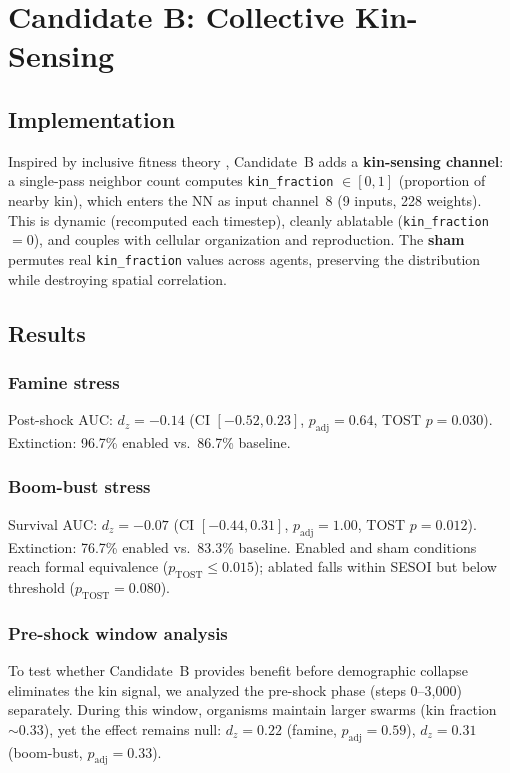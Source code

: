 \documentclass[letterpaper]{article}
\begin{document}
\section{Candidate B: Collective Kin-Sensing}

\subsection{Implementation}

Inspired by inclusive fitness theory \citep{hamilton_1964_genetical},
Candidate~B adds a \textbf{kin-sensing channel}: a single-pass neighbor
count computes \texttt{kin\_fraction} $\in [0, 1]$ (proportion of
nearby kin), which enters the NN as input channel~8 (9 inputs, 228
weights).  This is dynamic (recomputed each timestep), cleanly ablatable
(\texttt{kin\_fraction} $= 0$), and couples with cellular organization
and reproduction.  The \textbf{sham} permutes real
\texttt{kin\_fraction} values across agents, preserving the distribution
while destroying spatial correlation.

\subsection{Results}

\subsubsection*{Famine stress}
Post-shock AUC: $d_z = -0.14$ (CI $[-0.52, 0.23]$, $p_\mathrm{adj} =
0.64$, TOST $p = 0.030$).  Extinction: 96.7\% enabled vs.\ 86.7\%
baseline.

\subsubsection*{Boom-bust stress}
Survival AUC: $d_z = -0.07$ (CI $[-0.44, 0.31]$, $p_\mathrm{adj} =
1.00$, TOST $p = 0.012$).  Extinction: 76.7\% enabled vs.\ 83.3\%
baseline.  Enabled and sham conditions reach formal equivalence
($p_\mathrm{TOST} \leq 0.015$); ablated falls within SESOI but below
threshold ($p_\mathrm{TOST} = 0.080$).

\subsubsection*{Pre-shock window analysis}
To test whether Candidate~B provides benefit before demographic collapse
eliminates the kin signal, we analyzed the pre-shock phase (steps
0--3{,}000) separately.  During this window, organisms maintain larger
swarms (kin fraction $\sim$0.33), yet the effect remains null: $d_z =
0.22$ (famine, $p_\mathrm{adj} = 0.59$), $d_z = 0.31$ (boom-bust,
$p_\mathrm{adj} = 0.33$).
\end{document}
